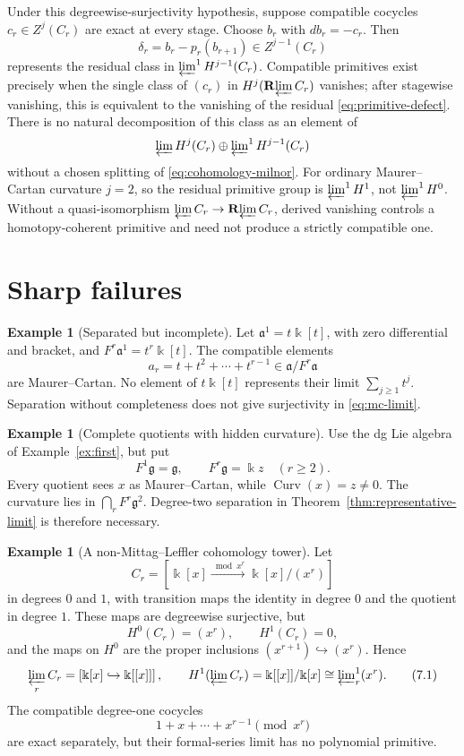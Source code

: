 \documentclass[11pt]{article}
\theoremstyle{definition}
\newtheorem{example}[theorem]{Example}
\theoremstyle{remark}
\newcommand{\Curv}{\operatorname{Curv}}
\newcommand{\Rlim}{\mathbf R\!\varprojlim}
\begin{document}
Under this degreewise-surjectivity hypothesis, suppose compatible cocycles
$c_r\in Z^j(C_r)$ are exact at every stage.
Choose $b_r$ with $db_r=-c_r$.  Then
\[
 \delta_r=b_r-p_r(b_{r+1})\in Z^{j-1}(C_r)
 \tag{6.7}\label{eq:primitive-defect}
\]
represents the residual class in
$\varprojlim^1H^{j-1}(C_r)$.  Compatible primitives exist precisely when the
single class of $(c_r)$ in $H^j(\Rlim C_r)$ vanishes; after stagewise
vanishing, this is equivalent to the vanishing of the residual
\eqref{eq:primitive-defect}.  There is no natural decomposition of this
class as an element of
\[
 \varprojlim H^j(C_r)\oplus
 \varprojlim\nolimits^1H^{j-1}(C_r)
\]
without a chosen splitting of \eqref{eq:cohomology-milnor}.  For ordinary
Maurer--Cartan curvature $j=2$, so the residual primitive group is
$\varprojlim^1H^1$, not $\varprojlim^1H^0$.
Without a quasi-isomorphism
$\varprojlim C_r\to\Rlim C_r$, derived vanishing controls a
homotopy-coherent primitive and need not produce a strictly compatible one.

\section{Sharp failures}

\begin{example}[Separated but incomplete]\label{ex:incomplete}
Let $\mathfrak a^1=t\Bbbk[t]$, with zero differential and bracket, and
$F^r\mathfrak a^1=t^r\Bbbk[t]$.  The compatible elements
\[
 a_r=t+t^2+\cdots+t^{r-1}
 \in\mathfrak a/F^r\mathfrak a
\]
are Maurer--Cartan.  No element of $t\Bbbk[t]$ represents their limit
$\sum_{j\geq1}t^j$.  Separation without completeness does not give
surjectivity in \eqref{eq:mc-limit}.
\end{example}

\begin{example}[Complete quotients with hidden curvature]\label{ex:nonsep}
Use the dg Lie algebra of Example~\ref{ex:first}, but put
\[
 F^1\mathfrak g=\mathfrak g,
 \qquad
 F^r\mathfrak g=\Bbbk z\quad(r\geq2).
\]
Every quotient sees $x$ as Maurer--Cartan, while
$\Curv(x)=z\neq0$.  The curvature lies in
$\bigcap_rF^r\mathfrak g^2$.  Degree-two separation in
Theorem~\ref{thm:representative-limit} is therefore necessary.
\end{example}

\begin{example}[A non-Mittag--Leffler cohomology tower]
\label{ex:nonml}
Let
\[
 C_r=\left[
 \Bbbk[x]\xrightarrow{\bmod x^r}\Bbbk[x]/(x^r)
 \right]
\]
in degrees $0$ and $1$, with transition maps the identity in degree $0$ and
the quotient in degree $1$.  These maps are degreewise surjective, but
\[
 H^0(C_r)=(x^r),
 \qquad H^1(C_r)=0,
\]
and the maps on $H^0$ are the proper inclusions
$(x^{r+1})\hookrightarrow(x^r)$.  Hence
\[
 \varprojlim_rC_r=
 \left[\Bbbk[x]\hookrightarrow\Bbbk[[x]]\right],
 \qquad
 H^1(\varprojlim C_r)=\Bbbk[[x]]/\Bbbk[x]
 \cong\varprojlim\nolimits^1_r(x^r).
 \tag{7.1}\label{eq:nonml-calculation}
\]
The compatible degree-one cocycles
\[
 1+x+\cdots+x^{r-1}\pmod{x^r}
\]
are exact separately, but their formal-series limit has no polynomial
primitive.
\end{example}
\end{document}
